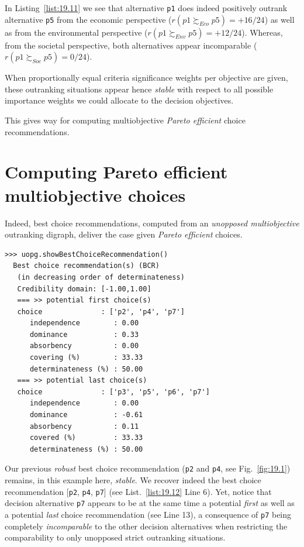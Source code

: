 In Listing~\vref{list:19.11} we see that alternative \texttt{p1} does indeed positively outrank alternative \texttt{p5} from the economic perspective ($r(p1 \succsim_{Eco} p5) = +16/24$) as well as from the environmental perspective ($r(p1 \succsim_{Env} p5) = +12/24$). Whereas, from the societal perspective, both alternatives appear incomparable ($r(p1 \succsim_{Soc} p5) = 0/24$).

When proportionally equal criteria significance weights per objective are given, these outranking situations appear hence \emph{stable} with respect to all possible importance weights we could allocate to the decision objectives.

This gives way for computing multiobjective \emph{Pareto efficient} choice recommendations. 

\section{Computing Pareto efficient multiobjective choices}
\label{sec:19.6}

Indeed, best choice recommendations, computed from an \emph{unopposed multiobjective} outranking digraph, deliver the case given \emph{Pareto efficient} choices. 
\begin{lstlisting}[caption={Pareto efficient multiobjective choice},label=list:19.12]
>>> uopg.showBestChoiceRecommendation()
  Best choice recommendation(s) (BCR)
   (in decreasing order of determinateness)   
   Credibility domain: [-1.00,1.00]
   === >> potential first choice(s)
   choice              : ['p2', 'p4', 'p7']
      independence        : 0.00
      dominance           : 0.33
      absorbency          : 0.00
      covering (%)        : 33.33
      determinateness (%) : 50.00
   === >> potential last choice(s) 
   choice              : ['p3', 'p5', 'p6', 'p7']
      independence        : 0.00
      dominance           : -0.61
      absorbency          : 0.11
      covered (%)         : 33.33
      determinateness (%) : 50.00
\end{lstlisting}

Our previous \emph{robust} best choice recommendation (\texttt{p2} and \texttt{p4}, see Fig.~\vref{fig:19.1}) remains, in this example here, \emph{stable}. We recover indeed the best choice recommendation [\texttt{p2}, \texttt{p4}, \texttt{p7}] (see List.~\vref{list:19.12} Line 6). Yet, notice that decision alternative \texttt{p7} appears to be at the same time a potential \emph{first} as well as a potential \emph{last} choice recommendation (see Line 13), a consequence of \texttt{p7} being completely \emph{incomparable} to the other decision alternatives when restricting the comparability to only unopposed strict outranking situations. 

